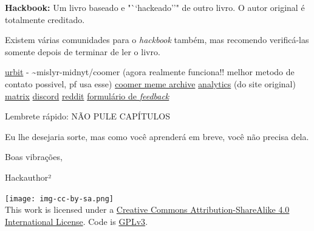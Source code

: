 \documentclass[
  spanish,
  openany]{book}
\let\oldhref\href
\renewcommand{\href}[2]{\textcolor{linkcolor}{\oldhref{#1}{#2}}}
\begin{document}
{\textbf{Hackbook:} Um livro baseado e "``hackeado''" de outro livro. O autor original é totalmente creditado. }

Existem várias comunidades para o \emph{hackbook} também, mas recomendo verificá-las somente depois de terminar de ler o livro.

\href{https://urbit.org}{urbit} - \textasciitilde mislyr-midnyt/coomer (agora realmente funciona!! melhor metodo de contato possivel, pf usa esse) \textbar{} \href{https://coomer.org}{coomer meme archive} \textbar{} \href{https://plausible.io/easypeasymethod.org}{analytics} (do site original) \textbar{} \href{https://matrix.to/\#/!xmJZznbJXuwzEGSEti:matrix.org?via=matrix.org}{matrix} \textbar{} \href{https://discord.com/invite/bCXEnf9}{discord} \textbar{} \href{https://reddit.com/r/pmohackbook}{reddit} \textbar{} \href{https://forms.gle/p7cTxowaNpKqgi5Z7}{formulário de \emph{feedback}}

Lembrete rápido: NÃO PULE CAPÍTULOS

Eu lhe desejaria sorte, mas como você aprenderá em breve, você não precisa dela.

Boas vibrações,

Hackauthor²

\texttt{[image: img-cc-by-sa.png]}\\

This work is licensed under a \href{https://creativecommons.org/licenses/by-sa/4.0/}{Creative Commons Attribution-ShareAlike 4.0 International License}. Code is \href{https://gitlab.com/snuggy/easypeasy/-/blob/master/LICENSE}{GPLv3}.
\end{document}

